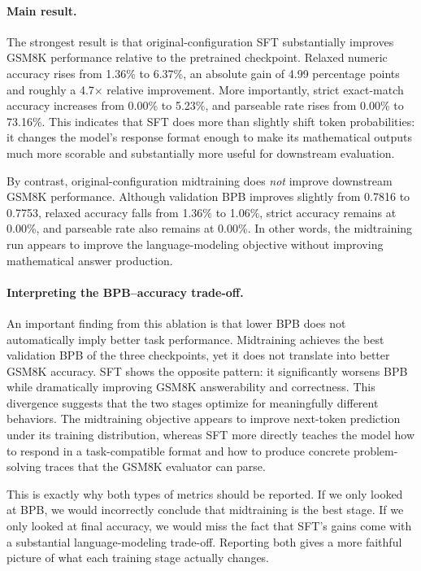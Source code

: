 \paragraph{Main result.}
The strongest result is that original-configuration SFT substantially improves GSM8K performance relative to the pretrained checkpoint. Relaxed numeric accuracy rises from 1.36\% to 6.37\%, an absolute gain of 4.99 percentage points and roughly a 4.7$\times$ relative improvement. More importantly, strict exact-match accuracy increases from 0.00\% to 5.23\%, and parseable rate rises from 0.00\% to 73.16\%. This indicates that SFT does more than slightly shift token probabilities: it changes the model's response format enough to make its mathematical outputs much more scorable and substantially more useful for downstream evaluation.

By contrast, original-configuration midtraining does \emph{not} improve downstream GSM8K performance. Although validation BPB improves slightly from 0.7816 to 0.7753, relaxed accuracy falls from 1.36\% to 1.06\%, strict accuracy remains at 0.00\%, and parseable rate also remains at 0.00\%. In other words, the midtraining run appears to improve the language-modeling objective without improving mathematical answer production.

\paragraph{Interpreting the BPB--accuracy trade-off.}
An important finding from this ablation is that lower BPB does not automatically imply better task performance. Midtraining achieves the best validation BPB of the three checkpoints, yet it does not translate into better GSM8K accuracy. SFT shows the opposite pattern: it significantly worsens BPB while dramatically improving GSM8K answerability and correctness. This divergence suggests that the two stages optimize for meaningfully different behaviors. The midtraining objective appears to improve next-token prediction under its training distribution, whereas SFT more directly teaches the model how to respond in a task-compatible format and how to produce concrete problem-solving traces that the GSM8K evaluator can parse.

This is exactly why both types of metrics should be reported. If we only looked at BPB, we would incorrectly conclude that midtraining is the best stage. If we only looked at final accuracy, we would miss the fact that SFT's gains come with a substantial language-modeling trade-off. Reporting both gives a more faithful picture of what each training stage actually changes.


